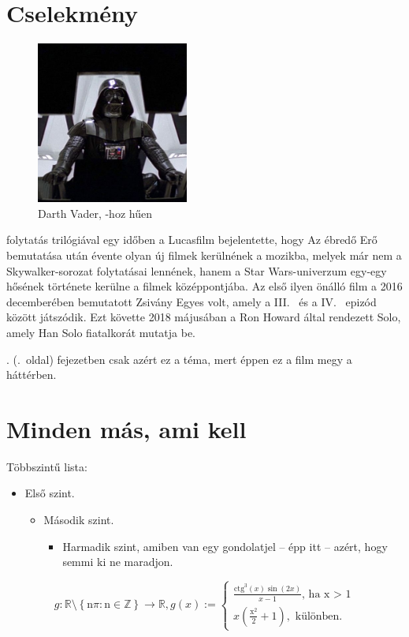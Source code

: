 \documentclass[]{thesis-ekf}
\theoremstyle{definition}
\theoremstyle{remark}
\begin{document}
	\section{Cselekmény}
	\begin{figure}	
		\centering
		\includegraphics[width=5cm]{figures/dv}
		\caption{Darth Vader, -hoz hűen}
		\label{fig-dw}
	\end{figure}
	\Az folytatás trilógiával egy időben a Lucasfilm bejelentette, hogy Az ébredő Erő bemutatása után évente olyan új filmek kerülnének a mozikba, melyek már nem a Skywalker-sorozat folytatásai lennének, hanem a Star Wars-univerzum egy-egy hősének története kerülne a filmek középpontjába. Az első ilyen önálló film a 2016 decemberében bemutatott Zsivány Egyes volt, amely a III.~ és a IV.~ epizód között játszódik. Ezt követte 2018 májusában a Ron Howard által rendezett Solo, amely Han Solo fiatalkorát mutatja be. 	
	
	. (\pageref{fej-filmek}.~oldal) fejezetben csak azért ez a téma, mert éppen ez a film megy a háttérben. 
	
	\section{Minden más, ami kell}
	Többszintű lista:
	\begin{itemize}
		\item Első szint.
		\begin{itemize}
			\item Második szint.
			\begin{itemize}
				\item Harmadik szint, amiben van egy gondolatjel -- épp itt -- azért, hogy semmi ki ne maradjon.
			\end{itemize}
		\end{itemize}
	\end{itemize}
	\begin{equation}\label{m-kepl}
		g: \mathbb{R}\setminus \left\{ \mathcal{\mathrm{n}\pi}:\mathcal{\mathrm{n}\in \mathbb{Z}} \right\}\longrightarrow \mathbb{R},  g(x) :=  \left\{ \begin{array}{cl}
			\frac{\mathrm{ctg}_{}^{3}(x)\sin(2x)}{x-1} \text{, ha x > 1}\\
			x(\frac{\mathrm{x}_{}^{2}}{2}+1), \text{ különben.}
		\end{array} \right.
	\end{equation} 
	
\end{document}
